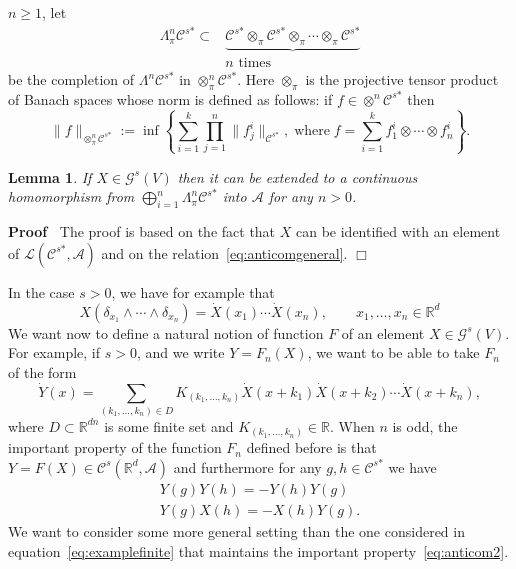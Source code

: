 \documentclass{article}
\newcommand{\assign}{:=}
\newcommand{\asterisk}{\mathord{*}}
\newcommand{\tmop}[1]{\ensuremath{\operatorname{#1}}}
\newenvironment{proof}{\noindent\textbf{Proof\ }}{\hspace*{\fill}$\Box$\medskip}
\newtheorem{lemma}[theorem]{Lemma}
\begin{document}
$n \geqslant 1$, let
\[ \begin{array}{cc}
     \Lambda^n_{\pi} \mathcal{C}^{s \asterisk} \subset &
     \underbrace{\mathcal{C}^{s \asterisk} \otimes_{\pi} \mathcal{C}^{s
     \asterisk} \otimes_{\pi} \cdots \otimes_{\pi} \mathcal{C}^{s
     \asterisk}}\\
     & \text{$n$ times}
   \end{array} \]
be the completion of $\Lambda^n \mathcal{C}^{s \asterisk}$ in $\otimes^n_{\pi}
\mathcal{C}^{s \asterisk}$. Here $\otimes_{\pi}$ is the projective tensor
product of Banach spaces whose norm is defined as follows: if $f \in \otimes^n
\mathcal{C}^{s \asterisk}$ then
\[ \| f \|_{\otimes^n_{\pi} \mathcal{C}^{s \asterisk}} \assign \inf \left\{
   \sum_{i = 1}^k \prod_{j = 1}^n \| f^i_j \|_{\mathcal{C}^{s \asterisk}},
   \tmop{where} f = \sum_{i = 1}^k f^i_1 \otimes \cdots \otimes f^i_n \right\}
   . \]
\begin{lemma}
  \label{remark_regularity}If $X \in \mathcal{G}^s (V)$ then it can be
  extended to a continuous homomorphism from $\bigoplus_{i = 1}^n
  \Lambda_{\pi}^n \mathcal{C}^{s \asterisk}$ into $\mathcal{A}$ for any $n >
  0$.
\end{lemma}

\begin{proof}
  The proof is based on the fact that $X$ can be identified with an element of
  $\mathcal{L} (\mathcal{C}^{s \asterisk}, \mathcal{A})$ and on the
  relation~{\eqref{eq:anticomgeneral}}.
\end{proof}

In the case $s > 0$, we have for example that
\[ X (\delta_{x_1} \wedge \cdots \wedge \delta_{x_n}) = \dot{X} (x_1) \cdots
   \dot{X} (x_n), \qquad x_1, \ldots, x_n \in \mathbb{R}^d \]
We want now to define a natural notion of function $F$ of an element $X \in
\mathcal{G}^s (V)$. For example, if $s > 0$, and we write $Y = F_n (X)$, we
want to be able to take $F_n$ of the form
\begin{equation}
  \dot{Y} (x) = \sum_{(k_1, \ldots, k_n) \in D} K_{(k_1, \ldots, k_n)} \dot{X}
  (x + k_1) \dot{X} (x + k_2) \cdots \dot{X} (x + k_n)
  \label{eq:examplefinite},
\end{equation}
where $D \subset \mathbb{R}^{d n}$ is some finite set and $K_{(k_1, \ldots,
k_n)} \in \mathbb{R}$. When $n$ is odd, the important property of the function
$F_n$ defined before is that $Y = F (X) \in \mathcal{C}^s (\mathbb{R}^d,
\mathcal{A})$ and furthermore for any $g, h \in \mathcal{C}^{s \asterisk}$ we
have
\begin{equation}
  \begin{array}{c}
    Y (g) Y (h) = - Y (h) Y (g)\\
    Y (g) X (h) = - X (h) Y (g) .
  \end{array} \label{eq:anticom2}
\end{equation}
We want to consider some more general setting than the one considered in
equation~{\eqref{eq:examplefinite}} that maintains the important
property~{\eqref{eq:anticom2}}.
\end{document}
